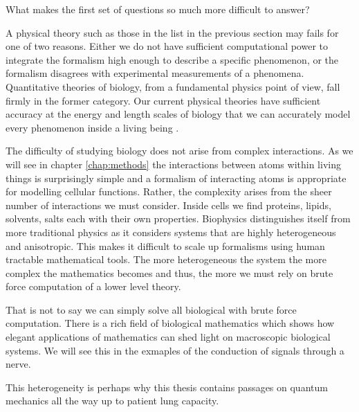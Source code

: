 What makes the first set of questions so much more difficult to answer?

A physical theory such as those in the list in the previous section may fails for one of two reasons. Either we do not have sufficient computational power to integrate the formalism high enough to describe a specific phenomenon, or the formalism disagrees with experimental measurements of a phenomena. Quantitative theories of biology, from a fundamental physics point of view, fall firmly in the former category. Our current physical theories have sufficient accuracy at the energy and length scales of biology that we can accurately model every phenomenon inside a living being \cite{carroll2021}. 

 The difficulty of studying biology does not arise from complex interactions. As we will see in chapter \ref{chap:methods} the interactions between atoms within living things is surprisingly simple and a formalism of interacting atoms is appropriate for modelling cellular functions. Rather, the complexity arises from the sheer number of interactions we must consider. Inside cells we find proteins, lipids, solvents, salts each with their own properties. Biophysics distinguishes itself from more traditional physics as it considers systems that are highly heterogeneous and anisotropic. This makes it difficult to scale up formalisms using human tractable mathematical tools. The more heterogeneous the system the more complex the mathematics becomes and thus, the more we must rely on brute force computation of a lower level theory.

 That is not to say we can simply solve all biological with brute force computation. There is a rich field of biological mathematics which shows how elegant applications of mathematics can shed light on macroscopic biological systems. We will see this in the exmaples of the conduction of signals through a nerve. 

This heterogeneity is perhaps why this thesis contains passages on quantum mechanics all the way up to patient lung capacity.


